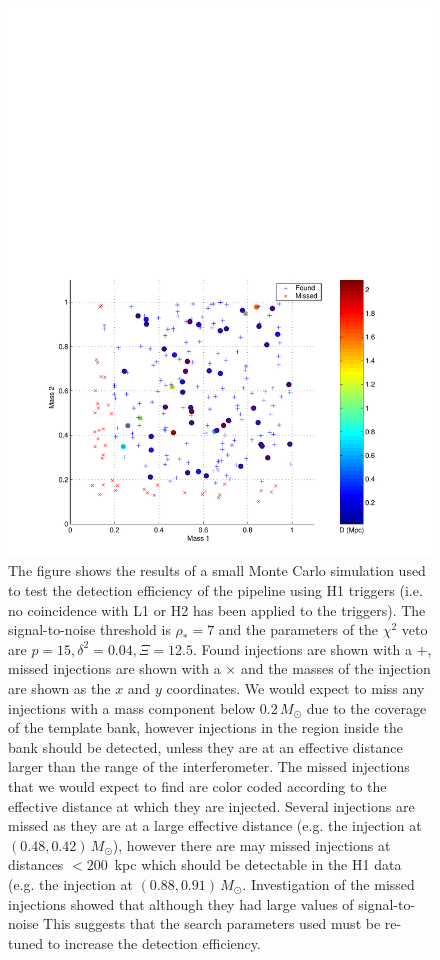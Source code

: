 \begin{figure}[p]
\begin{center}
\includegraphics[width=\textwidth]{figures/result/h1_inj_mass_7_0_delta_0_04_chisq_12_5}
\end{center}
\caption[Found and Missed H1 Injections for $\Xi = 12.5 \delta^2 = 0.04$]{%
\label{f:h1_missed_tuning}%
The figure shows the results of a small Monte Carlo simulation used to test
the detection efficiency of the pipeline using H1 triggers (i.e. no
coincidence with L1 or H2 has been applied to the triggers). The
signal-to-noise threshold is $\rho_\ast = 7$ and the parameters of the
$\chi^2$ veto are $p = 15, \delta^2 = 0.04, \Xi = 12.5$. Found injections are
shown with a $+$, missed injections are shown with a $\times$ and the masses
of the injection are shown as the $x$ and $y$ coordinates. We would expect to
miss any injections with a mass component below $0.2\,M_\odot$ due to the
coverage of the template bank, however injections in the region inside the
bank should be detected, unless they are at an effective distance larger than
the range of the interferometer. The missed injections that we would expect to
find are color coded according to the effective distance at which they are
injected.  Several injections are missed as they are at a large effective
distance (e.g.  the injection at $(0.48,0.42)\,M_\odot$), however there are
may missed injections at distances $< 200$~kpc which should be detectable in
the H1 data (e.g. the injection at $(0.88,0.91)\,M_\odot$. Investigation of
the missed injections showed that although they had large values of
signal-to-noise This suggests that
the search parameters used must be re-tuned to increase the detection
efficiency.
}
\end{figure}

